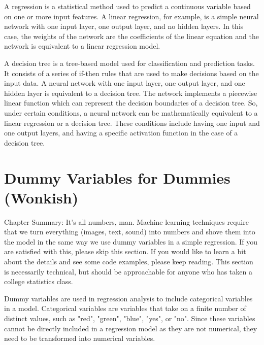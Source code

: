 A regression is a statistical method used to predict a continuous variable based on one or more input features. A linear regression, for example, is a simple neural network with one input layer, one output layer, and no hidden layers. In this case, the weights of the network are the coefficients of the linear equation and the network is equivalent to a linear regression model.

A decision tree is a tree-based model used for classification and prediction tasks. It consists of a series of if-then rules that are used to make decisions based on the input data. A neural network with one input layer, one output layer, and one hidden layer is equivalent to a decision tree. The network implements a piecewise linear function which can represent the decision boundaries of a decision tree. So, under certain conditions, a neural network can be mathematically equivalent to a linear regression or a decision tree. These conditions include having one input and one output layers, and having a specific activation function in the case of a decision tree. 

\section{Dummy Variables for Dummies (Wonkish)} 

Chapter Summary: It’s all numbers, man. Machine learning techniques require that we turn everything (images, text, sound) into numbers and shove them into the model in the same way we use dummy variables in a simple regression. If you are satisfied with this, please skip this section. If you would like to learn a bit about the details and see some code examples, please keep reading. This section is necessarily technical, but should be approachable for anyone who has taken a college statistics class.

Dummy variables are used in regression analysis to include categorical variables in a model. Categorical variables are variables that take on a finite number of distinct values, such as "red", "green", "blue", "yes", or "no". Since these variables cannot be directly included in a regression model as they are not numerical, they need to be transformed into numerical variables.

